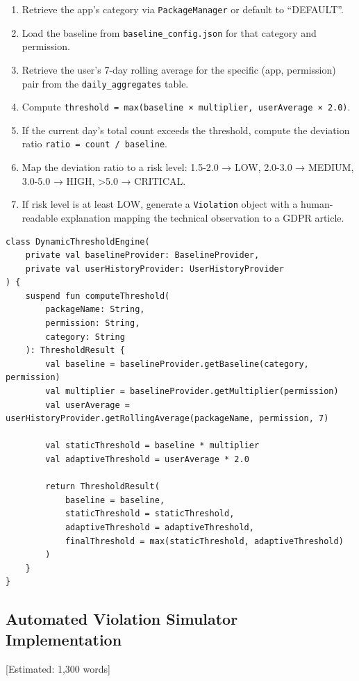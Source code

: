 \begin{enumerate}
\item Retrieve the app's category via \texttt{PackageManager} or default to ``DEFAULT''.
\item Load the baseline from \texttt{baseline\_config.json} for that category and permission.
\item Retrieve the user's 7-day rolling average for the specific (app, permission) pair from the \texttt{daily\_aggregates} table.
\item Compute \texttt{threshold = max(baseline × multiplier, userAverage × 2.0)}.
\item If the current day's total count exceeds the threshold, compute the deviation ratio \texttt{ratio = count / baseline}.
\item Map the deviation ratio to a risk level: 1.5-2.0 → LOW, 2.0-3.0 → MEDIUM, 3.0-5.0 → HIGH, >5.0 → CRITICAL.
\item If risk level is at least LOW, generate a \texttt{Violation} object with a human-readable explanation mapping the technical observation to a GDPR article.
\end{enumerate}

\begin{lstlisting}[caption=Dynamic threshold computation]
class DynamicThresholdEngine(
    private val baselineProvider: BaselineProvider,
    private val userHistoryProvider: UserHistoryProvider
) {
    suspend fun computeThreshold(
        packageName: String,
        permission: String,
        category: String
    ): ThresholdResult {
        val baseline = baselineProvider.getBaseline(category, permission)
        val multiplier = baselineProvider.getMultiplier(permission)
        val userAverage = userHistoryProvider.getRollingAverage(packageName, permission, 7)
        
        val staticThreshold = baseline * multiplier
        val adaptiveThreshold = userAverage * 2.0
        
        return ThresholdResult(
            baseline = baseline,
            staticThreshold = staticThreshold,
            adaptiveThreshold = adaptiveThreshold,
            finalThreshold = max(staticThreshold, adaptiveThreshold)
        )
    }
}
\end{lstlisting}

\subsection{Automated Violation Simulator Implementation} [Estimated: 1,300 words]

